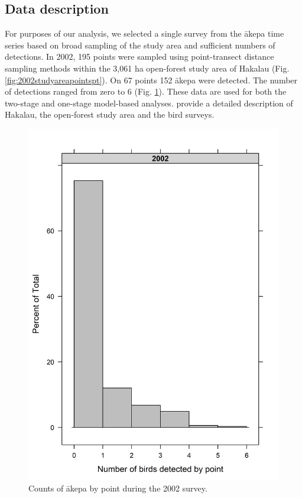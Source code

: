 \documentclass[preprint,12pt]{elsarticle}
\newcommand{\akepa}{\textquotesingle\={a}kepa}  %
\begin{document}
\subsection*{Data description}
For purposes of our analysis, we selected a single survey from the \akepa{} time series based on broad sampling of the study area and sufficient numbers of detections. In 2002, 195 points were sampled using point-transect distance sampling methods within the 3,061 ha open-forest study area of Hakalau (Fig. \ref{fig:2002studyareapointspt}). On 67 points 152 \akepa{} were detected. The number of detections ranged from zero to 6 (Fig. \ref{fig:2002countspt}). These data are used for both the two-stage and one-stage model-based analyses. \cite{camp_population_2010,camp_statespace_2016} provide a detailed description of Hakalau, the open-forest study area and the bird surveys.

\begin{figure}
	\centering
	\includegraphics[scale=0.5]{figures/2002counts_pt}
	\caption{Counts of \akepa{} by point during the 2002 survey.}
	\label{fig:2002countspt}
\end{figure}
\end{document}
